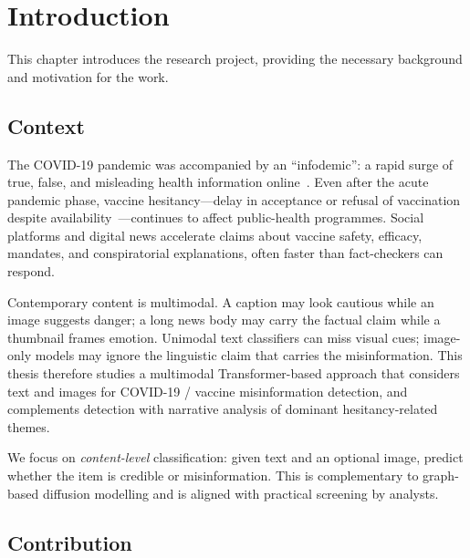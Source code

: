 \documentclass[12pt, a4paper]{report}
\begin{document}
\setcounter{page}{1}


\chapter{Introduction}
\label{chap:introduction}

This chapter introduces the research project, providing the necessary background and motivation for the work.

\section{Context}
\label{sec:context}

The COVID-19 pandemic was accompanied by an ``infodemic'': a rapid surge of true, false, and misleading health information online~\cite{who2020infodemic}.
Even after the acute pandemic phase, vaccine hesitancy---delay in acceptance or refusal of vaccination despite availability~\cite{macdonald2015hesitancy}---continues to affect public-health programmes.
Social platforms and digital news accelerate claims about vaccine safety, efficacy, mandates, and conspiratorial explanations, often faster than fact-checkers can respond.

Contemporary content is multimodal.
A caption may look cautious while an image suggests danger; a long news body may carry the factual claim while a thumbnail frames emotion.
Unimodal text classifiers can miss visual cues; image-only models may ignore the linguistic claim that carries the misinformation.
This thesis therefore studies a multimodal Transformer-based approach that considers text and images for COVID-19 / vaccine misinformation detection, and complements detection with narrative analysis of dominant hesitancy-related themes.

We focus on \emph{content-level} classification: given text and an optional image, predict whether the item is credible or misinformation.
This is complementary to graph-based diffusion modelling and is aligned with practical screening by analysts.

\section{Contribution}
\label{sec:contribution}
\end{document}

